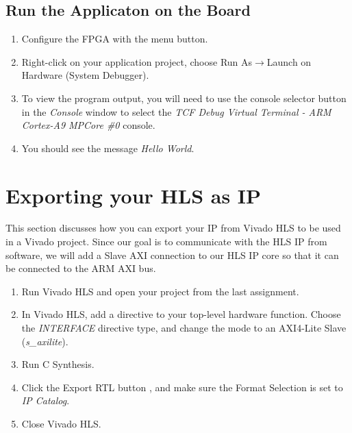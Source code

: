 \subsection{Run the Applicaton on the Board}
\begin{enumerate}
	\item Configure the FPGA with the  menu button.
	\item Right-click on your application project, choose Run As$\rightarrow$Launch on Hardware (System Debugger).
	\item To view the program output, you will need to use the console selector button  in the \emph{Console} window to select the \emph{TCF Debug Virtual Terminal - ARM Cortex-A9 MPCore \#0} console.
	\item You should see the message \emph{Hello World}.
\end{enumerate}


\section{Exporting your HLS as IP}
This section discusses how you can export your IP from Vivado HLS to be used in a Vivado project.  Since our goal is to communicate with the HLS IP from software, we will add a Slave AXI connection to our HLS IP core so that it can be connected to the ARM AXI bus.

\begin{enumerate}
	\item Run Vivado HLS and open your project from the last assignment.
	\item In Vivado HLS, add a directive to your top-level hardware function.  Choose the \emph{INTERFACE} directive type, and change the mode to an AXI4-Lite Slave (\emph{s\_axilite}).
	\item Run C Synthesis.
	\item Click the Export RTL button , and make sure the Format Selection is set to \emph{IP Catalog}.
	\item Close Vivado HLS.
\end{enumerate}

